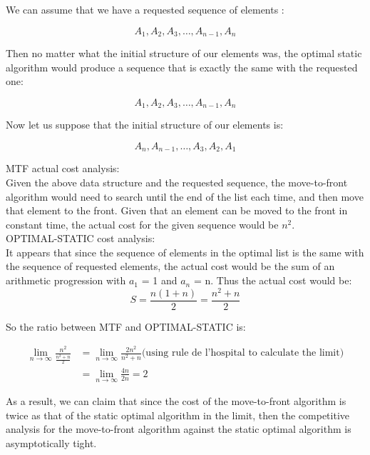 We can assume that we have a requested sequence of elements :

$$A_{1}, A_{2}, A_{3},\dots, A_{n-1}, A_{n}$$

Then no matter what the initial structure of our elements was, the optimal static algorithm would produce a sequence that is exactly the same with the requested one:

$$A_{1}, A_{2}, A_{3},\dots, A_{n-1}, A_{n}$$

Now let us suppose that the  initial structure of our elements is:

$$A_{n}, A_{n-1},\dots, A_{3}, A_{2}, A_{1}$$

MTF actual cost analysis: \\

Given the above data structure and the requested sequence, the move-to-front algorithm would need to search until the end of the list each time, and then move that element to the front. Given that an element can be moved to the front in constant time, the actual cost for the given sequence would be $n^2$. \\ 

OPTIMAL-STATIC cost analysis: \\

It appears that since the sequence of elements in the optimal list is the same with the sequence of requested elements, the actual cost would be the sum of an arithmetic progression with $a_1$ = 1 and $a_n$ = n. Thus the actual cost would be:
$$
  S = \frac {n(1+n)}{2} = \frac {n^2+n}{2}
$$

So the ratio between MTF and OPTIMAL-STATIC is:

\begin{align*}
	\lim_{n  \to \infty} {\frac{n^{2}}{\frac{n^{2}+n}{2}}} &=\lim_{n \to \infty} {\frac{2 n^{2}}{n^{2}+n}} \text{(using rule de l'hospital to calculate the limit)} \\
	&= \lim_{n \to \infty} {\frac{4n}{2n}} = 2
\end{align*}

As a result, we can claim that since the cost of the move-to-front algorithm is twice as that of the static optimal algorithm in the limit, then the competitive analysis for the move-to-front algorithm against the static optimal algorithm is asymptotically tight.
